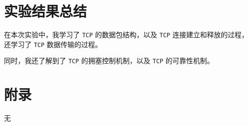 \documentclass{article}
\begin{document}
\section{实验结果总结}

在本次实验中，我学习了 \texttt{TCP} 的数据包结构，以及 \texttt{TCP} 连接建立和释放的过程，还学习了 \texttt{TCP} 数据传输的过程。

同时，我还了解到了 \texttt{TCP} 的拥塞控制机制，以及 \texttt{TCP} 的可靠性机制。

\section{附录}

无
\end{document}
